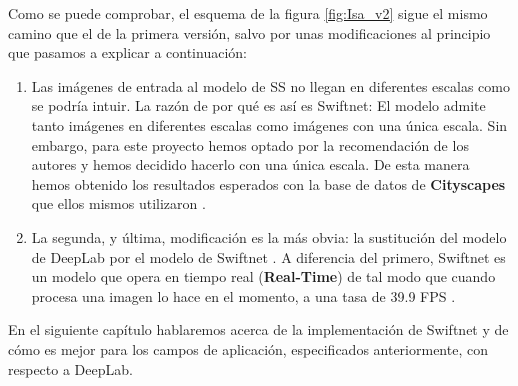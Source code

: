 Como se puede comprobar, el esquema de la figura \ref{fig:Isa_v2} sigue el mismo camino que el de la primera versión, salvo por unas modificaciones al principio que pasamos a explicar a continuación:

\begin{enumerate}

\item Las imágenes de entrada al modelo de \ac{SS} no llegan en diferentes escalas como se podría intuir. La razón de por qué es así es Swiftnet: El modelo admite tanto imágenes en diferentes escalas como imágenes con una única escala. Sin embargo, para este proyecto hemos optado por la recomendación de los autores \cite{github_swiftnet} y hemos decidido hacerlo con una única escala. De esta manera hemos obtenido los resultados esperados con la base de datos de \textbf{Cityscapes} \cite{cityscapes} que ellos mismos utilizaron \cite{swiftnet}.

\item La segunda, y última, modificación es la más obvia: la sustitución del modelo de DeepLab \cite{deeplab} por el modelo de Swiftnet \cite{swiftnet}. A diferencia del primero, Swiftnet es un modelo que opera en tiempo real (\textbf{Real-Time}) de tal modo que cuando procesa una imagen lo hace en el momento, a una tasa de 39.9 \ac{FPS} \cite{swiftnet}. %

\end{enumerate}


En el siguiente capítulo hablaremos acerca de la implementación de Swiftnet y de cómo es mejor para los campos de aplicación, especificados anteriormente, con respecto a DeepLab.
